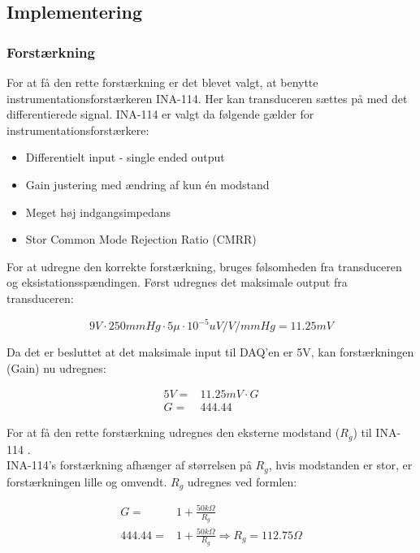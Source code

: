 \subsection{Implementering}
\subsubsection{Forstærkning}
For at få den rette forstærkning er det blevet valgt, at benytte instrumentationsforstærkeren INA-114. Her kan transduceren sættes på med det differentierede signal. INA-114 er valgt da følgende gælder\cite{Instrumentation} for instrumentationsforstærkere: 
\begin{itemize}
	\item Differentielt input - single ended output 
	\item Gain justering med ændring af kun én modstand 
	\item Meget høj indgangsimpedans 
	\item Stor Common Mode Rejection Ratio (CMRR)
\end{itemize}
For at udregne den korrekte forstærkning, bruges følsomheden fra transduceren og eksistationsspændingen.
Først udregnes det maksimale output fra transduceren:   
\begin{ceqn}
\begin{equation}
9V\cdot 250mmHg \cdot 5\mu\cdot 10^{-5} uV/V/mmHg  = 11.25mV
\end{equation} 
\end{ceqn}
Da det er besluttet at det maksimale input til DAQ'en \cite{DSB} er 5V, kan forstærkningen (Gain) nu udregnes:
\begin{ceqn}
\begin{equation}
\begin{split}
5V=& 11.25mV \cdot G \\
G =& 444.44
\end{split}
\end{equation}
\end{ceqn}
For at få den rette forstærkning udregnes den eksterne modstand ($ R_g $) til INA-114 \cite{INA}.\\ 
INA-114's forstærkning afhænger af størrelsen på $ R_g $, hvis modstanden er stor, er forstærkningen lille og omvendt.  $ R_g $ udregnes ved formlen: 
\begin{ceqn}
\begin{equation}
\begin{split}
G=&1+\frac{50k\Omega}{R_g}\\
444.44=& 1+\frac{50k\Omega}{R_g} \Rightarrow R_g= 112.75 \Omega
\end{split}
\end{equation}
\end{ceqn}
